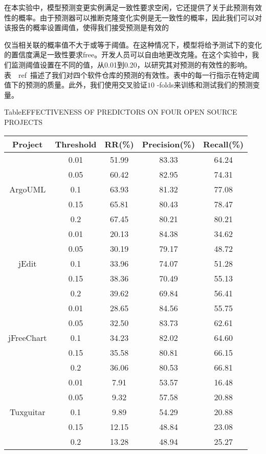 在本实验中，模型预测变更实例满足一致性要求空闲，它还提供了关于此预测有效性的概率。由于预测器可以推断克隆变化实例是无一致性的概率，因此我们可以对该报告的概率设置阈值，使得我们接受预测是有效的{仅当相关联的概率值不大于或等于阈值。在这种情况下，模型将给予测试下的变化的置信度满足一致性要求free。开发人员可以自由地更改克隆。在这个实验中，我们监测阈值设置在不同的值，从0.01到0.20，以研究其对预测的有效性的影响。表~\ ref{}~描述了我们对四个软件仓库的预测的有效性。表中的每一行指示在特定阈值下的预测的质量。此外，我们使用交叉验证$ 10 $ -folds来训练和测试我们的预测变量。

\begin{table}[htbp]
{Table$\!$}{EFFECTIVENESS OF PREDICTORS ON FOUR OPEN SOURCE PROJECTS}
\vspace{0.5em}
\centering
\wuhao
\begin{tabular}{ccccc}
\toprule[1.5pt]
\textbf{Project}&\textbf{Threshold}&\textbf{RR(\%)}&\textbf{Precision(\%)}&\textbf{Recall(\%)}\\
\midrule[1pt]
\multirow{5}{*}{ArgoUML}
&0.01&	51.99&	83.33&	64.24\\
&0.05&	60.42&	82.95&	74.31\\
&0.1&	63.93&	81.32&	77.08\\
&0.15&	65.81&	80.43&	78.47\\
&0.2&	67.45&	80.21&	80.21\\
\hline
\multirow{5}{*}{jEdit}
&0.01&	20.13&	84.38&	34.62\\
&0.05&	30.19&	79.17&	48.72\\
&0.1&	33.96&	74.07&	51.28\\
&0.15&	38.36&	70.49&	55.13\\
&0.2&	39.62&	69.84&	56.41\\
\hline
\multirow{5}{*}{jFreeChart}
&0.01&	28.65&	84.56&	55.75\\
&0.05&	32.50&	83.73&	62.61\\
&0.1&	34.23&	82.02&	64.60\\
&0.15&	35.58&	80.81&	66.15\\
&0.2&	36.06&	80.53&	66.81\\
\hline
\multirow{5}{*}{Tuxguitar}
&0.01&	7.91&	53.57&	16.48\\
&0.05&	9.32&	57.58&	20.88\\
&0.1&	9.89&	54.29&	20.88\\
&0.15&	12.15&	48.84&	23.08\\
&0.2&	13.28&	48.94&	25.27\\
\bottomrule[1.5pt]
\end{tabular}
\end{table}

}
